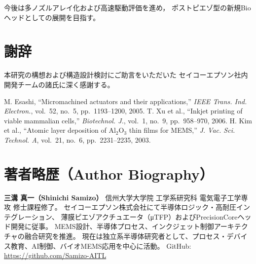\documentclass[conference]{IEEEtran}
\begin{document}
今後は多ノズルアレイ化および高速駆動評価を進め，
ポストピエゾ型の新規Bioヘッドとしての展開を目指す。

\section*{謝辞}
本研究の構想および構造設計検討にご助言をいただいた
セイコーエプソン社内開発チームの諸氏に深く感謝する。

\balance

\begin{thebibliography}{99}
M. Esashi, ``Micromachined actuators and their applications,'' 
\emph{IEEE Trans. Ind. Electron.}, vol.~52, no.~5, pp.~1193–1200, 2005.
T. Xu et al., ``Inkjet printing of viable mammalian cells,'' 
\emph{Biotechnol. J.}, vol.~1, no.~9, pp.~958–970, 2006.
H. Kim et al., ``Atomic layer deposition of Al$_2$O$_3$ thin films for MEMS,'' 
\emph{J. Vac. Sci. Technol. A}, vol.~21, no.~6, pp.~2231–2235, 2003.
\end{thebibliography}

\section*{著者略歴（Author Biography）}
\textbf{三溝 真一（Shinichi Samizo）} 信州大学大学院 工学系研究科 電気電子工学専攻 修士課程修了。  
セイコーエプソン株式会社にて半導体ロジック・高耐圧インテグレーション、
薄膜ピエゾアクチュエータ（μTFP）およびPrecisionCoreヘッド開発に従事。  
MEMS設計、半導体プロセス、インクジェット制御アーキテクチャの融合研究を推進。  
現在は独立系半導体研究者として、プロセス・デバイス教育、AI制御、バイオMEMS応用を中心に活動。  
GitHub: \url{https://github.com/Samizo-AITL}
\end{document}
